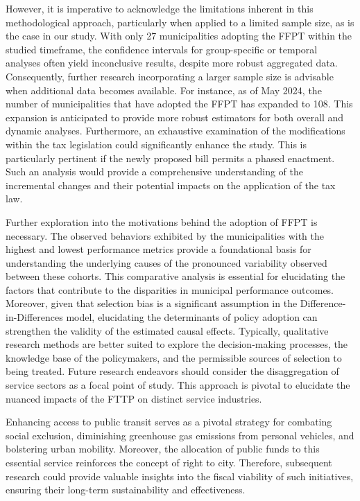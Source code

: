 \documentclass[12pt, a4paper, twoside]{article}
\numberwithin{equation}{subsection} %
\begin{document}
However, it is imperative to acknowledge the limitations inherent in
this methodological approach, particularly when applied to a limited
sample size, as is the case in our study. With only 27 municipalities
adopting the FFPT within the studied timeframe, the confidence intervals
for group-specific or temporal analyses often yield inconclusive
results, despite more robust aggregated data. Consequently, further
research incorporating a larger sample size is advisable when additional
data becomes available. For instance, as of May 2024, the number of
municipalities that have adopted the FFPT has expanded to 108. This
expansion is anticipated to provide more robust estimators for both
overall and dynamic analyses. Furthermore, an exhaustive examination of
the modifications within the tax legislation could significantly enhance
the study. This is particularly pertinent if the newly proposed bill
permits a phased enactment. Such an analysis would provide a
comprehensive understanding of the incremental changes and their
potential impacts on the application of the tax law.

Further exploration into the motivations behind the adoption of FFPT is
necessary. The observed behaviors exhibited by the municipalities with
the highest and lowest performance metrics provide a foundational basis
for understanding the underlying causes of the pronounced variability
observed between these cohorts. This comparative analysis is essential
for elucidating the factors that contribute to the disparities in
municipal performance outcomes. Moreover, given that selection bias is a
significant assumption in the Difference-in-Differences model,
elucidating the determinants of policy adoption can strengthen the
validity of the estimated causal effects. Typically, qualitative
research methods are better suited to explore the decision-making
processes, the knowledge base of the policymakers, and the permissible
sources of selection to being treated. Future research endeavors should
consider the disaggregation of service sectors as a focal point of
study. This approach is pivotal to elucidate the nuanced impacts of the
FTTP on distinct service industries.

Enhancing access to public transit serves as a pivotal strategy for
combating social exclusion, diminishing greenhouse gas emissions from
personal vehicles, and bolstering urban mobility. Moreover, the
allocation of public funds to this essential service reinforces the
concept of right to city. Therefore, subsequent research could provide
valuable insights into the fiscal viability of such initiatives,
ensuring their long-term sustainability and effectiveness.
\end{document}
